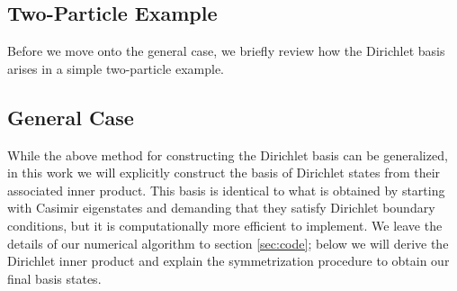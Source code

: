 \begin{subappendices}
\subsection{Two-Particle Example} Before we move onto the general case, we briefly review how the Dirichlet basis arises in a simple two-particle example.

\subsection{General Case} While the above method for constructing the Dirichlet basis can be generalized, in this work we will explicitly construct the basis of Dirichlet states from their associated inner product. This basis is identical to what is obtained by starting with Casimir eigenstates and demanding that they satisfy Dirichlet boundary conditions, but it is computationally more efficient to implement. We leave the details of our numerical algorithm to section \ref{sec:code}; below we will derive the Dirichlet inner product and explain the symmetrization procedure to obtain our final basis states.


\end{subappendices}
